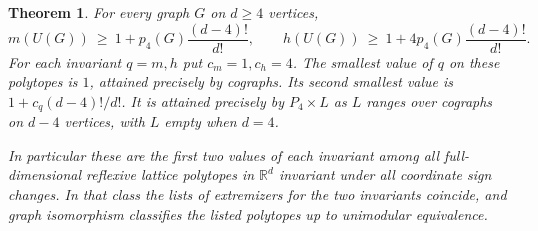 \documentclass[11pt,a4paper]{article}
\numberwithin{equation}{section}
\newtheorem{theorem}{Theorem}[section]
\begin{document}
\begin{theorem}\label{thm:both}
For every graph $G$ on $d\ge4$ vertices,
\[
 m(U(G))\ \ge\ 1+p_4(G)\frac{(d-4)!}{d!},\qquad h(U(G))\ \ge\ 1+4p_4(G)\frac{(d-4)!}{d!}.
\]
For each invariant $q=m,h$ put $c_m=1,c_h=4$. The smallest value of $q$ on these polytopes is $1$, attained precisely by cographs. Its second smallest value is $1+c_q(d-4)!/d!$. It is attained precisely by $P_4\times L$ as $L$ ranges over cographs on $d-4$ vertices, with $L$ empty when $d=4$.

In particular these are the first two values of each invariant among all full-dimensional reflexive lattice polytopes in $\mathbb R^d$ invariant under all coordinate sign changes. In that class the lists of extremizers for the two invariants coincide, and graph isomorphism classifies the listed polytopes up to unimodular equivalence.
\end{theorem}
\end{document}
